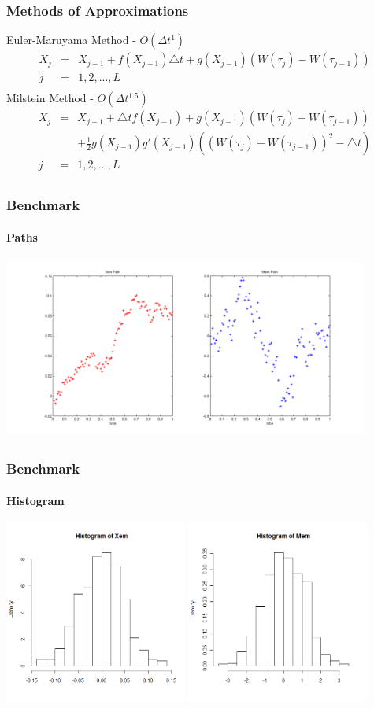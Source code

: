\begin{frame}
    \frametitle{Methods of Approximations}
	Euler-Maruyama Method - $O(\Delta t^{1})$
	\begin{eqnarray*}
		X_{j} &=& X_{j-1} + f(X_{j-1})\triangle t+ g(X_{j-1})(W(\tau_{j})-W(\tau_{j-1})) \\
		 j &=& 1,2,... ,L \\
	\end{eqnarray*}
	Milstein Method - $O(\Delta t^{1.5})$
	\begin{eqnarray*}
		X_{j} &=& X_{j-1} + \triangle tf(X_{j-1}) + g(X_{j-1})(W(\tau_{j})-W(\tau_{j-1})) 	\nonumber\\ 
		&& + \frac{1}{2} g(X_{j-1})g'(X_{j-1})((W(\tau_{j})-W(\tau_{j-1}))^{2}-\triangle t)\\
		 j &=& 1,2,... ,L \\
	\end{eqnarray*}
\end{frame}


\begin{frame}
    \frametitle{Benchmark}
	\framesubtitle{Paths}
\vspace{-5mm}
\includegraphics[height=6cm,width=12cm]{testpaths} 
\end{frame}


\begin{frame}
    \frametitle{Benchmark}
	\framesubtitle{Histogram}
\includegraphics[height=6cm,width=6cm]{testhistX}
\includegraphics[height=6cm,width=6cm]{testhistM}
\end{frame}


